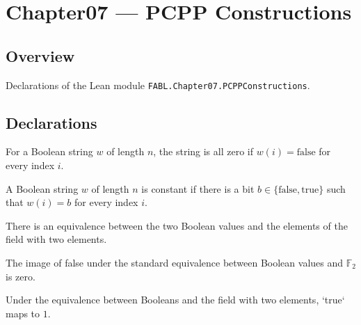 \chapter{Chapter07 — PCPP Constructions}
\section{Overview}

Declarations of the Lean module \texttt{FABL.Chapter07.PCPPConstructions}.

\section{Declarations}

\begin{definition}
\label{FABL.IsAllZeroString}
\leanok
For a Boolean string $w$ of length $n$, the string is all zero if $w(i)=\mathrm{false}$
for every index $i$.
\end{definition}

\begin{definition}
\label{FABL.IsAllEqualString}
\leanok
A Boolean string $w$ of length $n$ is constant if there is a bit
$b\in\{\mathrm{false},\mathrm{true}\}$ such that $w(i)=b$ for every index $i$.
\end{definition}

\begin{definition}
\leanok
{}
There is an equivalence between the two Boolean values and the elements of the field
with two elements.
\end{definition}

\begin{theorem}
\leanok
{}
The image of false under the standard equivalence between Boolean values and $\mathbb
F_2$ is zero.
\end{theorem}

\begin{theorem}
\leanok
{}
Under the equivalence between Booleans and the field with two elements, `true` maps to
$1$.
\end{theorem}

